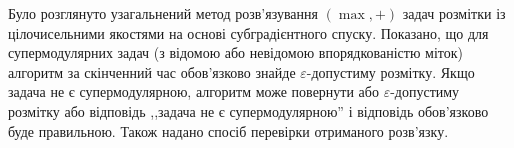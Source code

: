 \chapterConclusion

Було розглянуто узагальнений метод розв’язування $(\max ,+)$ задач розмітки із 
цілочисельними якостями на основі субградієнтного спуску. Показано, що для 
супермодулярних задач (з відомою або невідомою впорядкованістю міток) алгоритм
за скінченний час обов'язково знайде $\varepsilon$-допустиму розмітку.
Якщо задача не є супермодулярною, алгоритм може повернути або $\varepsilon$-допустиму
розмітку або відповідь ,,задача не є супермодулярною'' 
і відповідь обов'язково буде правильною. Також
надано спосіб перевірки отриманого розв'язку.